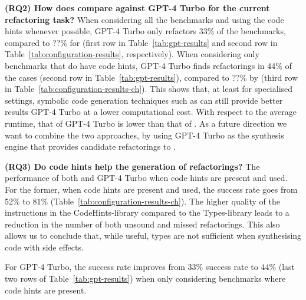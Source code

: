 \documentclass[sigconf,review,anonymous]{acmart}
\begin{document}
{\bf (RQ2) How does \tool compare against GPT-4 Turbo for the current refactoring task?}
When considering all the benchmarks and using the code hints whenever possible, GPT-4 Turbo only refactors 33\% of the benchmarks, compared to ??\% for \tool (first row in Table~\ref{tab:gpt-results} and second row in Table~\ref{tab:configuration-results}, respectively).
When considering only benchmarks that do have code hints, GPT-4 Turbo finds refactorings in 44\% of the cases (second row in Table~\ref{tab:gpt-results}), compared to
??\% by \tool (third row in Table~\ref{tab:configuration-results-ch}). 
This shows that, at least for specialised settings, symbolic code generation
techniques such as \tool can still provide better results GPT-4 Turbo at a lower computational cost.
With respect to the average runtime, that of GPT-4 Turbo is lower than that of \tool.
As a future direction we want to combine the two approaches, by using GPT-4 Turbo as the synthesis engine that provides candidate refactorings to \tool.

{\bf (RQ3) Do code hints help the generation of refactorings?}
The performance of both \tool and GPT-4 Turbo when code hints are present and used.
For the former, when code hints are present and used, the success rate goes from 52\% to 81\% (Table~\ref{tab:configuration-results-ch}).
The higher quality of the instructions in the CodeHints-library compared to the
Types-library leads to  a reduction in 
the number of both unsound and missed refactorings.
This also allows us to conclude that,
while useful, types are not sufficient when synthesising code with side effects.

For GPT-4 Turbo, the success rate improves from 33\% success rate to 44\% (last two rows of Table~\ref{tab:gpt-results}) when only considering benchmarks where code hints are present.




\end{document}
